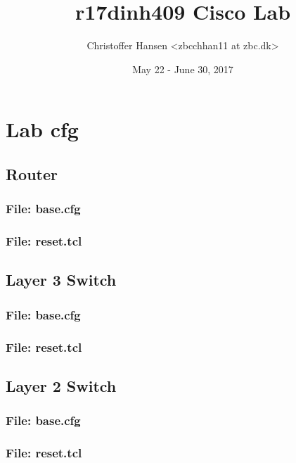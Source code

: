 \documentclass{article}
\begin{document}
\title{r17dinh409 Cisco Lab}
\author{Christoffer Hansen <zbcchhan11 at zbc.dk>}
\date{May 22 - June 30, 2017}
\maketitle

\newpage
\tableofcontents


%
%
\section{Lab cfg}


\subsection{Router}
\subsubsection{File: base.cfg}
%
\subsubsection{File: reset.tcl}
%


\subsection{Layer 3 Switch}
\subsubsection{File: base.cfg}

\subsubsection{File: reset.tcl}



\subsection{Layer 2 Switch}
\subsubsection{File: base.cfg}

\subsubsection{File: reset.tcl}


%
%




%
%
\end{document}
